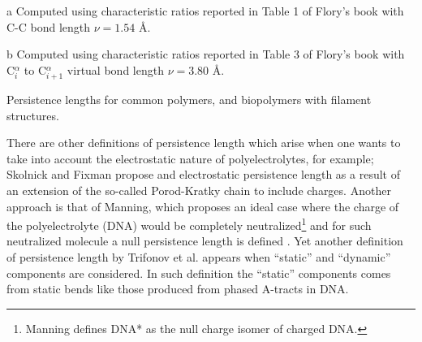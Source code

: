 \begin{table}[htbp]
\begin{center}
\begin{threeparttable}
\begin{tablenotes}
\item [a] Computed using  characteristic ratios reported in Table 1
  of Flory's book \cite{flory1969} with C-C bond length $\nu = 1.54$ \AA.
\item [b] Computed using  characteristic ratios reported in Table 3
  of Flory's book \cite{flory1969} with C$^{\alpha}_{i}$ to C$^{\alpha}_{i+1}$ virtual
  bond length $\nu = 3.80$ \AA.
\end{tablenotes}
\end{threeparttable}
\caption{Persistence lengths for common polymers, and biopolymers with
  filament structures.}
\label{tab:perval}
\end{center}
\end{table}


There are other definitions of persistence length which arise when one
wants   to   take   into   account   the   electrostatic   nature   of
polyelectrolytes, for example; Skolnick and Fixman \cite{skolnick1977}
propose  and  electrostatic  persistence  length  as a  result  of  an
extension  of the  so-called  Porod-Kratky chain  to include  charges.
Another  approach is  that of  Manning, which  proposes an  ideal case
where  the charge  of the  polyelectrolyte (DNA)  would  be completely
neutralized\footnote{Manning defines DNA* as the null charge isomer of
  charged DNA.}  and for  such neutralized molecule a null persistence
length  is  defined  \cite{manning2006}.  Yet  another  definition  of
persistence length by Trifonov et al. \cite{trifonov1987} appears when
``static''  and   ``dynamic''  components  are   considered.  In  such
definition  the ``static''  components  comes from  static bends  like
those produced from phased A-tracts in DNA.

